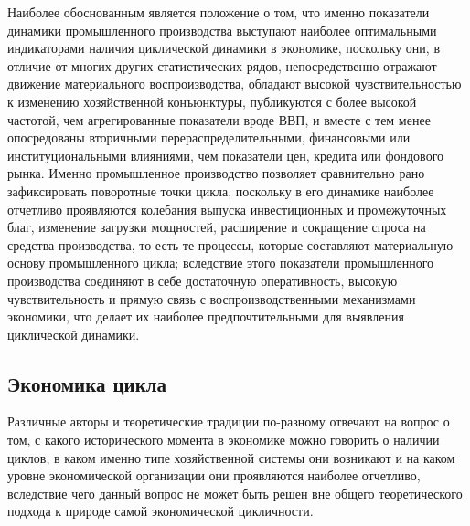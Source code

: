Наиболее обоснованным является положение о том, что именно показатели динамики промышленного производства выступают наиболее оптимальными индикаторами наличия циклической динамики в экономике, поскольку они, в отличие от многих других статистических рядов, непосредственно отражают движение материального воспроизводства, обладают высокой чувствительностью к изменению хозяйственной конъюнктуры, публикуются с более высокой частотой, чем агрегированные показатели вроде ВВП, и вместе с тем менее опосредованы вторичными перераспределительными, финансовыми или институциональными влияниями, чем показатели цен, кредита или фондового рынка. Именно промышленное производство позволяет сравнительно рано зафиксировать поворотные точки цикла, поскольку в его динамике наиболее отчетливо проявляются колебания выпуска инвестиционных и промежуточных благ, изменение загрузки мощностей, расширение и сокращение спроса на средства производства, то есть те процессы, которые составляют материальную основу промышленного цикла; вследствие этого показатели промышленного производства соединяют в себе достаточную оперативность, высокую чувствительность и прямую связь с воспроизводственными механизмами экономики, что делает их наиболее предпочтительными для выявления циклической динамики.

\subsection{Экономика цикла} %
Различные авторы и теоретические традиции по-разному отвечают на вопрос о том, с какого исторического момента в экономике можно говорить о наличии циклов, в каком именно типе хозяйственной системы они возникают и на каком уровне экономической организации они проявляются наиболее отчетливо, вследствие чего данный вопрос не может быть решен вне общего теоретического подхода к природе самой экономической цикличности.

